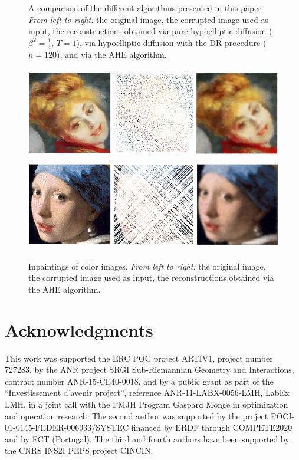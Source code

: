 \documentclass[proc]{edpsmath}
\begin{document}
\begin{figure}
  \caption{A comparison of the different algorithms presented in this paper. \emph{From left to right:} the original image, the corrupted image used as input, the reconstructions obtained via pure hypoelliptic diffusion ($\beta^2=\frac14,\, T=1$),
  {via  hypoelliptic diffusion with the DR procedure ($n=120$)}, and via the AHE algorithm.}
  \label{fig:comparison}
\end{figure}


\begin{figure}
  \includegraphics[height=4.0cm]{imgs/color1} \\ \vspace{.5em}
  \includegraphics[height=4.0cm]{imgs/color2}
  \caption{Inpaintings of color images. \emph{From left to right:} the original image, the corrupted image used as input, the reconstructions obtained via the AHE algorithm.
  }
  \label{fig:color-images}
\end{figure}


\section*{Acknowledgments}
This work was supported  the ERC POC project ARTIV1, project number
727283, by the ANR project SRGI Sub-Riemannian Geometry and Interactions,
contract number ANR-15-CE40-0018, and by a public grant as part of the ``Investissement d'avenir project'', reference ANR-11-LABX-0056-LMH, LabEx LMH, in a joint call with the FMJH Program Gaspard Monge in optimization and operation research. The second author was supported by the project POCI-01-0145-FEDER-006933/SYSTEC financed by ERDF through COMPETE2020 and by FCT (Portugal). The third and fourth authors have been supported by the CNRS INS2I PEPS project CINCIN.



\end{document}
